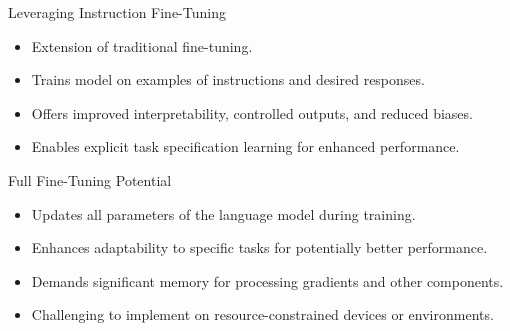 \begin{frame}[fragile]{Leveraging Instruction Fine-Tuning}
    \begin{itemize}
        \item Extension of traditional fine-tuning.
        \item Trains model on examples of instructions and desired responses.
        \item Offers improved interpretability, controlled outputs, and reduced biases.
        \item Enables explicit task specification learning for enhanced performance.
    \end{itemize}
\end{frame}

\begin{frame}[fragile]{Full Fine-Tuning Potential}
    \begin{itemize}
        \item Updates all parameters of the language model during training.
        \item Enhances adaptability to specific tasks for potentially better performance.
        \item Demands significant memory for processing gradients and other components.
        \item Challenging to implement on resource-constrained devices or environments.
    \end{itemize}
\end{frame}


